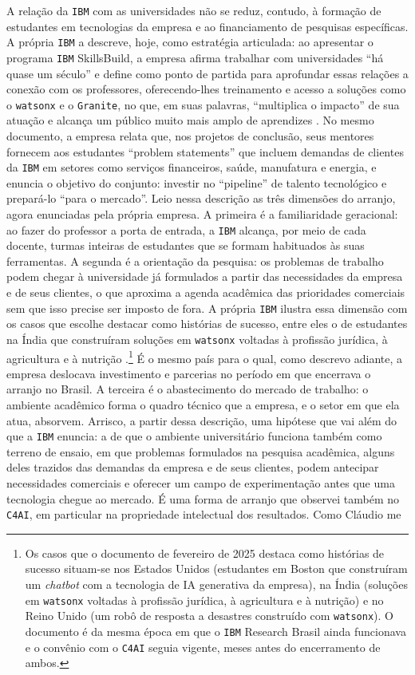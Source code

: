 A relação da \texttt{IBM} com as universidades não se reduz, contudo, à formação de estudantes em tecnologias da empresa e ao financiamento de pesquisas específicas. A própria \texttt{IBM} a descreve, hoje, como estratégia articulada: ao apresentar o programa \texttt{IBM} SkillsBuild, a empresa afirma trabalhar com universidades \enquote{há quase um século} e define como ponto de partida para aprofundar essas relações a conexão com os professores, oferecendo-lhes treinamento e acesso a soluções como o \texttt{watsonx} e o \texttt{Granite}, no que, em suas palavras, \enquote{multiplica o impacto} de sua atuação e alcança um público muito mais amplo de aprendizes \parencite{NixonSaintil2025IBM}. No mesmo documento, a empresa relata que, nos projetos de conclusão, seus mentores fornecem aos estudantes \enquote{problem statements} que incluem demandas de clientes da \texttt{IBM} em setores como serviços financeiros, saúde, manufatura e energia, e enuncia o objetivo do conjunto: investir no \enquote{pipeline} de talento tecnológico e prepará-lo \enquote{para o mercado}. Leio nessa descrição as três dimensões do arranjo, agora enunciadas pela própria empresa. A primeira é a familiaridade geracional: ao fazer do professor a porta de entrada, a \texttt{IBM} alcança, por meio de cada docente, turmas inteiras de estudantes que se formam habituados às suas ferramentas. A segunda é a orientação da pesquisa: os problemas de trabalho podem chegar à universidade já formulados a partir das necessidades da empresa e de seus clientes, o que aproxima a agenda acadêmica das prioridades comerciais sem que isso precise ser imposto de fora. A própria \texttt{IBM} ilustra essa dimensão com os casos que escolhe destacar como histórias de sucesso, entre eles o de estudantes na Índia que construíram soluções em \texttt{watsonx} voltadas à profissão jurídica, à agricultura e à nutrição \parencite{NixonSaintil2025IBM}.\footnote{Os casos que o documento de fevereiro de 2025 destaca como histórias de sucesso situam-se nos Estados Unidos (estudantes em Boston que construíram um \textit{chatbot} com a tecnologia de IA generativa da empresa), na Índia (soluções em \texttt{watsonx} voltadas à profissão jurídica, à agricultura e à nutrição) e no Reino Unido (um robô de resposta a desastres construído com \texttt{watsonx}). O documento é da mesma época em que o \texttt{IBM} Research Brasil ainda funcionava e o convênio com o \texttt{C4AI} seguia vigente, meses antes do encerramento de ambos.} É o mesmo país para o qual, como descrevo adiante, a empresa deslocava investimento e parcerias no período em que encerrava o arranjo no Brasil. A terceira é o abastecimento do mercado de trabalho: o ambiente acadêmico forma o quadro técnico que a empresa, e o setor em que ela atua, absorvem. Arrisco, a partir dessa descrição, uma hipótese que vai além do que a \texttt{IBM} enuncia: a de que o ambiente universitário funciona também como terreno de ensaio, em que problemas formulados na pesquisa acadêmica, alguns deles trazidos das demandas da empresa e de seus clientes, podem antecipar necessidades comerciais e oferecer um campo de experimentação antes que uma tecnologia chegue ao mercado. É uma forma de arranjo que observei também no \texttt{C4AI}, em particular na propriedade intelectual dos resultados. Como Cláudio me 